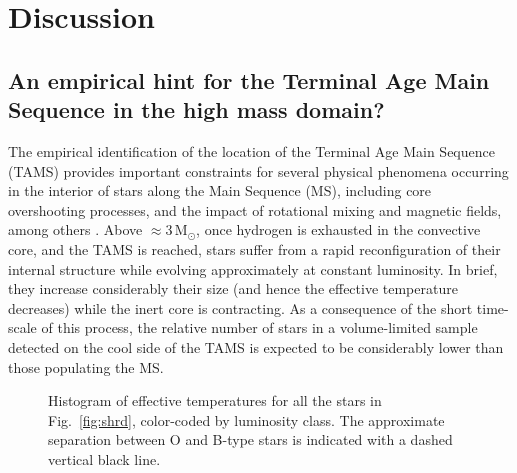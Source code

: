 \documentclass{aa}
\newcommand{\MSol}{\,\mbox{M$_\odot$}\xspace}
\begin{document}



\section{Discussion}
\label{section:5_tmp}




\subsection{An empirical hint for the Terminal Age Main Sequence in the high mass domain?}
\label{subsection:51_tmp}

The empirical identification of the location of the Terminal Age Main Sequence (TAMS) provides important constraints for several physical phenomena occurring in the interior of stars along the Main Sequence (MS), including core overshooting processes, and the impact of rotational mixing and magnetic fields, among others \citep[see, e.g.,][]{meynet00, vink00, maeder05, schootemeijer19, martinet21, scott21}. Above $\approx$3\MSol, once hydrogen is exhausted in the convective core, and the TAMS is reached, stars suffer from a rapid reconfiguration of their internal structure while evolving approximately at constant luminosity. In brief, they increase considerably their size (and hence the effective temperature decreases) while the inert core is contracting. As a consequence of the short time-scale of this process, the relative number of stars in a volume-limited sample detected on the cool side of the TAMS is expected to be considerably lower than those populating the MS.

\begin{figure}[!t]
\centering
{}
\caption{Histogram of effective temperatures for all the stars in Fig.~\ref{fig:shrd}, color-coded by luminosity class. The approximate separation between O and B-type stars is indicated with a dashed vertical black line.}
\label{fig:hist_teff}
\end{figure}
\end{document}
